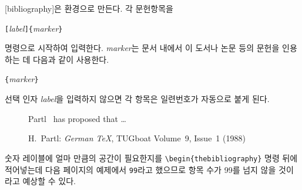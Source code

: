 [bibliography]은  환경으로 만든다.
각 문헌항목을
\begin{lscommand}
\verb|[|\emph{label}\verb|]{|\emph{marker}\verb|}|
\end{lscommand}
\noindent 명령으로 시작하여 입력한다.
\emph{marker}는 문서 내에서 이 도서나 논문 등의 문헌을 인용하는 데 다음과 같이
사용한다.
\begin{lscommand}
\verb|{|\emph{marker}\verb|}|
\end{lscommand}
\noindent 선택 인자 \emph{label}을 입력하지 않으면 각 항목은 일련번호가 자동으로 붙게 된다.
\begin{figure}[htp]
{
\renewcommand\bibname{Bibliography}
\begin{example}
Partl~\cite{pa} has
proposed that \ldots
\begin{thebibliography}{99}
 H.~Partl:
\emph{German \TeX},
TUGboat Volume~9, Issue~1 (1988)
\end{thebibliography}
\end{example}
}
\end{figure}

숫자 레이블에 얼마 만큼의 
  공간이 필요한지를
\verb|\begin{thebibliography}| 명령 뒤에 적어넣는데 다음 페이지의 예제에서 \verb|99|라고 했으므로 항목 수가 99를 넘지 않을 것이라고 예상할 수 있다.

